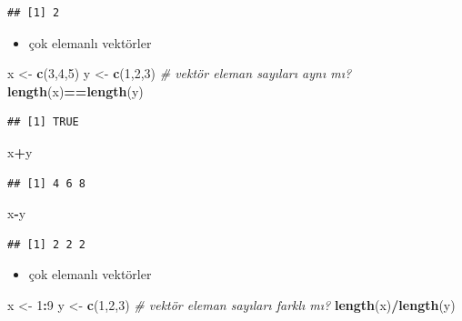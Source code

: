 \documentclass[
  oneside]{book}
\newenvironment{Shaded}{\begin{snugshade}}{\end{snugshade}}
\newcommand{\CommentTok}[1]{\textcolor[rgb]{0.56,0.35,0.01}{\textit{#1}}}
\newcommand{\DecValTok}[1]{\textcolor[rgb]{0.00,0.00,0.81}{#1}}
\newcommand{\FunctionTok}[1]{\textcolor[rgb]{0.13,0.29,0.53}{\textbf{#1}}}
\newcommand{\NormalTok}[1]{#1}
\newcommand{\OtherTok}[1]{\textcolor[rgb]{0.56,0.35,0.01}{#1}}
\newcommand{\SpecialCharTok}[1]{\textcolor[rgb]{0.81,0.36,0.00}{\textbf{#1}}}
\providecommand{\tightlist}{%
  \setlength{\itemsep}{0pt}\setlength{\parskip}{0pt}}
\begin{document}
\begin{verbatim}
## [1] 2
\end{verbatim}

\begin{itemize}
\tightlist
\item
  çok elemanlı vektörler
\end{itemize}

\begin{Shaded}
\begin{Highlighting}[]
\NormalTok{x }\OtherTok{\textless{}{-}} \FunctionTok{c}\NormalTok{(}\DecValTok{3}\NormalTok{,}\DecValTok{4}\NormalTok{,}\DecValTok{5}\NormalTok{)}
\NormalTok{y }\OtherTok{\textless{}{-}} \FunctionTok{c}\NormalTok{(}\DecValTok{1}\NormalTok{,}\DecValTok{2}\NormalTok{,}\DecValTok{3}\NormalTok{)}
\CommentTok{\# vektör eleman sayıları aynı mı?}
\FunctionTok{length}\NormalTok{(x)}\SpecialCharTok{==}\FunctionTok{length}\NormalTok{(y)}
\end{Highlighting}
\end{Shaded}

\begin{verbatim}
## [1] TRUE
\end{verbatim}

\begin{Shaded}
\begin{Highlighting}[]
\NormalTok{x}\SpecialCharTok{+}\NormalTok{y}
\end{Highlighting}
\end{Shaded}

\begin{verbatim}
## [1] 4 6 8
\end{verbatim}

\begin{Shaded}
\begin{Highlighting}[]
\NormalTok{x}\SpecialCharTok{{-}}\NormalTok{y}
\end{Highlighting}
\end{Shaded}

\begin{verbatim}
## [1] 2 2 2
\end{verbatim}

\begin{itemize}
\tightlist
\item
  çok elemanlı vektörler
\end{itemize}

\begin{Shaded}
\begin{Highlighting}[]
\NormalTok{x }\OtherTok{\textless{}{-}} \DecValTok{1}\SpecialCharTok{:}\DecValTok{9}
\NormalTok{y }\OtherTok{\textless{}{-}} \FunctionTok{c}\NormalTok{(}\DecValTok{1}\NormalTok{,}\DecValTok{2}\NormalTok{,}\DecValTok{3}\NormalTok{)}
\CommentTok{\# vektör eleman sayıları farklı mı?}
\FunctionTok{length}\NormalTok{(x)}\SpecialCharTok{/}\FunctionTok{length}\NormalTok{(y)}
\end{Highlighting}
\end{Shaded}
\end{document}
